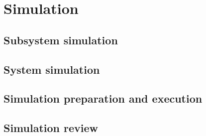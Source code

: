 \chapter{Simulation}
\section{Subsystem simulation}
\section{System simulation}
\section{Simulation preparation and execution}
\section{Simulation review}